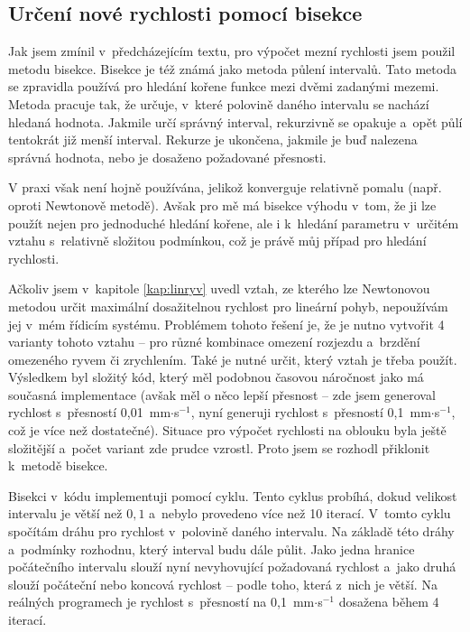 		
	
	\subsection{Určení nové rychlosti pomocí bisekce}\label{kap:bisekce}
	
	Jak jsem zmínil v~předcházejícím textu, pro výpočet mezní rychlosti jsem použil metodu bisekce. Bisekce je též známá jako metoda půlení intervalů\cite{bisekce}. Tato metoda se zpravidla používá pro hledání kořene funkce mezi dvěmi zadanými mezemi. Metoda pracuje tak, že určuje, v~které polovině daného intervalu se nachází hledaná hodnota. Jakmile určí správný interval, rekurzivně se opakuje a~opět půlí tentokrát již menší interval\cite{bisekce}. Rekurze je ukončena, jakmile je buď nalezena správná hodnota, nebo je dosaženo požadované přesnosti.
	
	V praxi však není hojně používána, jelikož konverguje relativně pomalu (např. oproti Newtonově metodě). Avšak pro mě má bisekce výhodu v~tom, že ji lze použít nejen pro jednoduché hledání kořene, ale i k~hledání parametru v~určitém vztahu s~relativně složitou podmínkou, což je právě můj případ pro hledání rychlosti.
	
	Ačkoliv jsem v~kapitole \ref{kap:linryv} uvedl vztah, ze kterého lze Newtonovou metodou určit maximální dosažitelnou rychlost pro lineární pohyb, nepoužívám jej v~mém řídicím systému. Problémem tohoto řešení je, že je nutno vytvořit 4 varianty tohoto vztahu -- pro různé kombinace omezení rozjezdu a~brzdění omezeného ryvem či zrychlením. Také je nutné určit, který vztah je třeba použít. Výsledkem byl složitý kód, který měl podobnou časovou náročnost jako má současná implementace (avšak měl o něco lepší přesnost -- zde jsem generoval rychlost s~přesností 0,01~mm$\cdot$s$^{-1}$, nyní generuji rychlost s~přesností 0,1~mm$\cdot$s$^{-1}$, což je více než dostatečné). Situace pro výpočet rychlosti na oblouku byla ještě složitější a~počet variant zde prudce vzrostl. Proto jsem se rozhodl přiklonit k~metodě bisekce.
	
	Bisekci v~kódu implementuji pomocí cyklu. Tento cyklus probíhá, dokud velikost intervalu je větší než $0,1$ a~nebylo provedeno více než 10 iterací. V~tomto cyklu spočítám dráhu pro rychlost v~polovině daného intervalu. Na základě této dráhy a~podmínky rozhodnu, který interval budu dále půlit. Jako jedna hranice počátečního intervalu slouží nyní nevyhovující požadovaná rychlost a~jako druhá slouží počáteční nebo koncová rychlost -- podle toho, která z~nich je větší. Na reálných programech je rychlost s~přesností na 0,1~mm$\cdot$s$^{-1}$ dosažena během 4 iterací.
	
